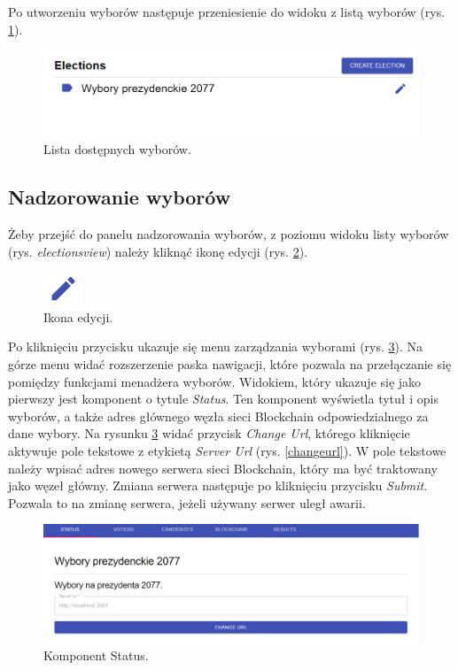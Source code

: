\documentclass[a4paper,12pt]{book}
\begin{document}
Po utworzeniu wyborów następuje przeniesienie do widoku z listą wyborów (rys. \ref{electionsview}).

\begin{figure}[h]
	\centering
	\includegraphics[width=\textwidth]{images/electionsview.png}
	\caption{Lista dostępnych wyborów.}\label{electionsview}
\end {figure}

\subsection{Nadzorowanie wyborów}

Żeby przejść do panelu nadzorowania wyborów, z poziomu widoku listy wyborów (rys. \textit{electionsview}) należy kliknąć ikonę edycji (rys. \ref{penicon}).

\begin{figure}[h]
	\centering
	\includegraphics{images/penicon.png}
	\caption{Ikona edycji.}\label{penicon}
\end {figure}

Po kliknięciu przycisku ukazuje się menu zarządzania wyborami (rys. \ref{electionmanager}). Na górze menu widać rozszerzenie paska nawigacji, które pozwala na przełączanie się pomiędzy funkcjami menadżera wyborów. Widokiem, który ukazuje się jako pierwszy jest komponent o tytule \textit{Status}. Ten komponent wyświetla tytuł i opis wyborów, a także adres głównego węzła sieci Blockchain odpowiedzialnego za dane wybory. Na rysunku \ref{electionmanager} widać przycisk \textit{Change Url}, którego kliknięcie aktywuje pole tekstowe z etykietą \textit{Server Url} (rys. \ref{changeurl}). W pole tekstowe należy wpisać adres nowego serwera sieci Blockchain, który ma być traktowany jako węzeł główny. Zmiana serwera następuje po kliknięciu przycisku \textit{Submit}. Pozwala to na zmianę serwera, jeżeli używany serwer uległ awarii.

\begin{figure}[h]
	\centering
	\includegraphics[width=\textwidth]{images/electionmanager.png}
	\caption{Komponent Status.}\label{electionmanager}
\end {figure}
\end{document}
